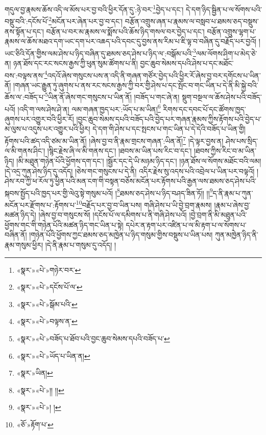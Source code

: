 གདུལ་བྱ་རྣམས་ཆོས་འདི་ལ་མོས་པར་བྱ་བའི་ཕྱིར་དོན་དུ་:ཉེ་བར་\footnote{«སྣར་»«པེ་»གཉེར་བར་}བྱེད་པ་དང་། དེ་དག་ཉིད་སྦྱིན་པ་ལ་སོགས་པའི་བསྡུ་བའི་:དངོས་པོ་\footnote{«སྣར་»«པེ་»དངོས་པོ་ལ་}མངོན་པར་ཞེན་པར་བྱ་བ་དང་། བརྩོན་འགྲུས་ཞན་པ་རྣམས་ལ་བསླབ་པ་ཐམས་ཅད་བསྡུས་ནས་སྟོན་པ་དང་། བརྩོན་པ་བར་མ་རྣམས་ལ་སྨོས་པའི་ཆོས་ཉིད་གསལ་བར་བྱེད་པ་དང་། བརྩོན་འགྲུས་ལྷག་པ་རྣམས་ལ་ཆོས་མཐའ་དག་ཡང་དག་པར་འཆད་པའི་དབང་དུ་བྱས་ནས་རིམ་པ་ཇི་ལྟ་བ་བཞིན་དུ་བརྗོད་པར་བྱའོ། །ཡང་ཅིའི་དོན་གྱིས་ལམ་ཤེས་པ་ཉིད་བཞིན་དུ་ཐམས་ཅད་ཤེས་པ་ཉིད་ལ་:བསྒོམ་པའི་\footnote{«སྣར་»«པེ་»སྒོམ་པའི་}ལམ་ལོགས་ཤིག་པ་མེད་ཅེ་ན། ཉན་ཐོས་དང་རང་སངས་རྒྱས་ཀྱི་ཕུན་སུམ་ཚོགས་པ་ནི། བྱང་ཆུབ་སེམས་དཔའི་ཤེས་པ་དང་མཐོང་བས་:བལྟས་ནས་\footnote{«སྣར་»«པེ་»བལྟས་ན་}འདའོ་ཞེས་གསུངས་པས་ན་འདི་ནི་གཞན་གཙོར་བྱེད་པའི་ཕྱིར་རོ་ཞེས་བྱ་བར་དགོངས་པ་ཡིན་ནོ། །གཞན་ཡང་རྒྱུན་ཏུ་ཞུགས་པ་ནས་རང་སངས་རྒྱས་ཀྱི་བར་གྱི་ཤེས་པ་དང་སྤོང་བ་གང་ཡིན་པ་དེ་ནི་མི་སྐྱེ་བའི་ཆོས་ལ་:བཟོད་པ་\footnote{«སྣར་»«པེ་»བཟོད་པ་ཐོབ་པའི་བྱང་ཆུབ་སེམས་དཔའི་བཟོད་པ་}ཡིན་ནོ་ཞེས་གང་གསུངས་པ་ཡིན་ནོ། །བཟོད་པ་གང་ཞེ་ན། སྡུག་བསྔལ་ལ་ཆོས་ཤེས་པའི་བཟོད་པའོ། །འདི་ག་ལས་ཤེས་ཤེ་ན། ལམ་གཞན་ཁྱད་པར་:ཡོད་པ་མ་ཡིན།\footnote{«སྣར་»«པེ་»ཡོད་པ་ཡིན་ན།} རིགས་དང་དབང་པོ་དང་ཚོགས་ཁྱད་ཞུགས་པར་འགྱུར་བའི་ཕྱིར་རོ། །བྱང་ཆུབ་སེམས་དཔའི་བཟོད་པའི་བྱེད་པར་གཞན་རྣམས་ཀྱིས་རྟོགས་པའི་བྱེད་པ་མ་ལུས་པ་འདུས་པར་འགྱུར་པའི་ཕྱིར། དེ་དག་གི་ཤེས་པ་དང་སྤངས་པ་གང་ཡིན་པ་དེ་དེའི་བཟོད་པ་ཡིན་གྱི། རྟོགས་པའི་ཚད་འདི་ཙམ་མ་ཡིན་ནོ། །ཞེས་བྱ་བ་ནི་རྣམ་གྲངས་གཞན་:ཡིན་ནོ།\footnote{«སྣར་»ཡིན།} །དེ་ལྟར་བྱས་ན། ཤེས་པས་སྲིད་ལ་མི་གནས་ཤིང་། །སྙིང་རྗེས་ཞི་ལ་མི་གནས་དང་། །ཐབས་མ་ཡིན་པས་རིང་བ་དང་། །ཐབས་ཀྱིས་རིང་བ་མ་ཡིན་ཉིད། །མི་མཐུན་གཉེན་པོའི་ཕྱོགས་དག་དང་། །སྦྱོར་དང་དེ་ཡི་མཉམ་ཉིད་དང་། །ཉན་ཐོས་ལ་སོགས་མཐོང་བའི་ལམ། །དེ་འདྲ་ཀུན་ཤེས་ཉིད་དུ་འདོད། །ཅེས་གང་གསུངས་པ་དེ་ནི། འདིར་རྗེས་སུ་འདས་པའི་འབྲེལ་པ་ཡིན་པར་བལྟའོ། །ཤེས་རབ་ཀྱི་ཕ་རོལ་ཏུ་ཕྱིན་པའི་མན་ངག་གི་བསྟན་བཅོས་མངོན་པར་རྟོགས་པའི་རྒྱན་ལས་ཐམས་ཅད་ཤེས་པའི་སྐབས་སྤྱོད་པའི་ཁྱད་པར་གྱི་ལེའུ་སྟེ་གསུམ་པའོ། །\footnote{«སྣར་»«པེ་»།། །།}ཐམས་ཅད་ཤེས་པ་ཉིད་བཤད་ཟིན་ཏོ།། །།\footnote{«སྣར་»«པེ་»། །}ད་ནི་རྣམ་པ་ཀུན་མངོན་པར་རྫོགས་པ་:རྟོགས་པ་\footnote{«ཅོ་»རྟོག་པ་}བརྗོད་པར་བྱ་བ་ཡིན་པས། གཞི་ཤེས་པ་ཡི་བྱེ་བྲག་རྣམས། །རྣམ་པ་ཞེས་བྱ་མཚན་ཉིད་དེ། །ཞེས་བྱ་བ་གསུངས་སོ། །དངོས་པོ་ལ་དམིགས་པ་ནི་གཞི་ཤེས་པའོ། །བྱེ་བྲག་ནི་མི་མཐུན་པའི་ཕྱོགས་གང་གི་གཉེན་པོའི་མཚན་ཉིད་གང་ཡིན་པ་སྟེ། དཔེར་ན་རྟག་པར་འཛིན་པ་ལ་མི་རྟག་པ་ལ་སོགས་པ་བཞིན་ནོ། །གཉེན་པོའི་ཕྱོགས་ཀྱང་ཐམས་ཅད་མཁྱེན་པ་ཉིད་གསུམ་གྱིས་བསྡུས་པ་ཡིན་པས། ཀུན་མཁྱེན་ཉིད་ནི་རྣམ་གསུམ་ཕྱིར། །དེ་ནི་རྣམ་པ་གསུམ་དུ་འདོད། །
